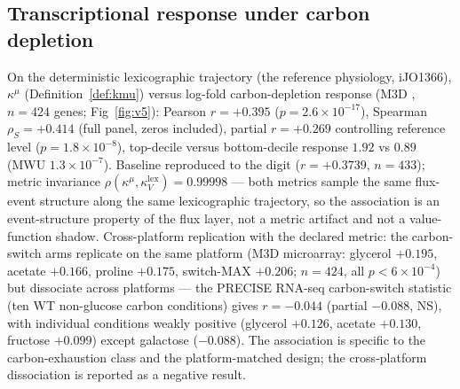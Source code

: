 \documentclass[11pt,a4paper]{article}
\theoremstyle{plain}
\theoremstyle{definition}
\theoremstyle{remark}
\newcommand{\kk}{\kappa_{\!V}}
\newcommand{\kmu}{\kappa^{\mu}}
\begin{document}
\subsection{Transcriptional response under carbon depletion}
\label{sec:v5}
On the deterministic lexicographic trajectory (the reference physiology, iJO1366),
$\kmu$ (Definition~\ref{def:kmu}) versus log-fold carbon-depletion
response (M3D \citep{faith2008}, $n = 424$ genes;
Fig~\ref{fig:v5}):
Pearson $r = +0.395$ ($p = 2.6 \times 10^{-17}$), Spearman
$\rho_S = +0.414$ (full panel, zeros included), partial $r = +0.269$
controlling reference level
($p = 1.8 \times 10^{-8}$), top-decile versus bottom-decile response
$1.92$ vs $0.89$ (MWU $1.3 \times 10^{-7}$). Baseline reproduced to the
digit ($r = +0.3739$, $n = 433$); metric invariance
$\rho(\kmu, \kk^{\mathrm{lex}}) = 0.99998$ --- both metrics sample the
same flux-event structure along the same lexicographic trajectory, so
the association is an event-structure property of the flux layer, not a
metric artifact and not a value-function shadow. Cross-platform
replication with the declared metric: the carbon-switch arms replicate
on the same platform (M3D microarray: glycerol $+0.195$, acetate
$+0.166$, proline $+0.175$, switch-MAX $+0.206$; $n = 424$, all
$p < 6 \times 10^{-4}$) but dissociate across platforms --- the
PRECISE RNA-seq carbon-switch statistic (ten WT non-glucose carbon
conditions) gives $r = -0.044$ (partial $-0.088$, NS), with
individual conditions weakly positive (glycerol $+0.126$, acetate
$+0.130$, fructose $+0.099$) except galactose ($-0.088$). The
association is specific to the carbon-exhaustion class and the
platform-matched design; the cross-platform dissociation is reported
as a negative result.
\end{document}
